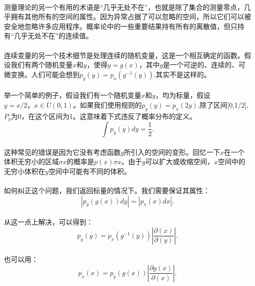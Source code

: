\documentclass{article}
\begin{document}
   \paragraph{}
   测量理论的另一个有用的术语是“几乎无处不在”，也就是除了集合的测量零点，几乎拥有其他所有的空间的属性。因为异常占据了可以忽略的空间，所以它们可以被安全地忽略许多应用程序。概率论中的一些重要结果持有所有的离散值，但只持有“几乎无处不在”的连续值。
   \paragraph{}
   连续变量的另一个技术细节是处理连续的随机变量，这是一个相互确定的函数。假设我们有两个随机变量$x$和$y$，使得$y = g (x)$，其中$g$是一个可逆的、连续的、可微变换。人们可能会想到$p_{y}(y)=p_{x}(g^{-1}(y))$.其实不是这样的。
   \paragraph{}
   举一个简单的例子，假设我们有一个随机变量$x$和$y$，均为标量，假设$y = x /2，x \in U(0,1)$。如果我们使用规则的$p_{y}(y)=p_{x}(2y)$,除了区间[0,1/2],$P_{y}$为0，在这个区间为1。这意味着下式违反了概率分布的定义。
   \begin{equation}
     \int p_{y}(y)dy=\frac{1}{2}.\tag{3.43}
   \end{equation}
   \paragraph{}
   这种常见的错误是因为它没有考虑函数$g$所引入的空间的变形。回忆一下$x$在一个体积无穷小的区域$\sigma x$的概率是$p(x)\sigma x$。由于$g$可以扩大或收缩空间，$x$空间中的无穷小体积在$y$空间中可能有不同的体积。
   \paragraph{}
   如何纠正这个问题，我们返回标量的情况下。我们需要保证其属性：
   \begin{equation}
      |p_{y}(g(x))dy|=|p_{x}(x)dx|.\tag{3.44}
   \end{equation}
   \paragraph{}
   从这一点上解决，可以得到：
    \begin{equation}
      p_{y}(y)=p_{x}(g^{-1}(y))|\frac{\partial{(x)}}{\partial(y)}|.\tag{3.45}
   \end{equation}
   \paragraph{}
   也可以用：
    \begin{equation}
      p_{x}(x)=p_{y}(g(x))|\frac{\partial{g(x)}}{\partial(x)}|.\tag{3.46}
   \end{equation}
\end{document}
